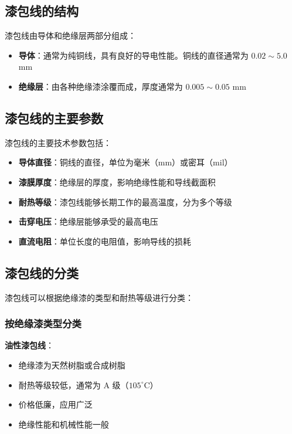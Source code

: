 \documentclass[12pt,UTF8]{ctexbook}
\begin{document}
\subsection{漆包线的结构}

漆包线由导体和绝缘层两部分组成：

\begin{itemize}[leftmargin=3.5em]
    \item \textbf{导体}：通常为纯铜线，具有良好的导电性能。铜线的直径通常为 $0.02 \sim 5.0$ mm
    \item \textbf{绝缘层}：由各种绝缘漆涂覆而成，厚度通常为 $0.005 \sim 0.05$ mm
\end{itemize}

\subsection{漆包线的主要参数}

漆包线的主要技术参数包括：

\begin{itemize}[leftmargin=3.5em]
    \item \textbf{导体直径}：铜线的直径，单位为毫米（mm）或密耳（mil）
    \item \textbf{漆膜厚度}：绝缘层的厚度，影响绝缘性能和导线截面积
    \item \textbf{耐热等级}：漆包线能够长期工作的最高温度，分为多个等级
    \item \textbf{击穿电压}：绝缘层能够承受的最高电压
    \item \textbf{直流电阻}：单位长度的电阻值，影响导线的损耗
\end{itemize}

\subsection{漆包线的分类}

漆包线可以根据绝缘漆的类型和耐热等级进行分类：

\subsubsection{按绝缘漆类型分类}

\textbf{油性漆包线}：
\begin{itemize}[leftmargin=3.5em]
    \item 绝缘漆为天然树脂或合成树脂
    \item 耐热等级较低，通常为 A 级（$105^\circ$C）
    \item 价格低廉，应用广泛
    \item 绝缘性能和机械性能一般
\end{itemize}
\end{document}
